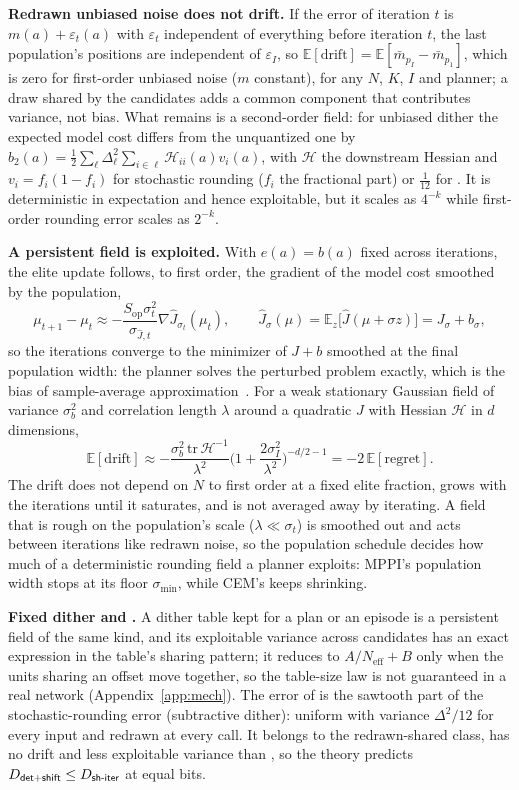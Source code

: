 \textbf{Redrawn unbiased noise does not drift.} If the error of iteration $t$ is $m(a)+\varepsilon_t(a)$ with $\varepsilon_t$ independent of everything before iteration $t$, the last population's positions are independent of $\varepsilon_I$, so $\mathbb E[\mathrm{drift}]=\mathbb E[\bar m_{p_I}-\bar m_{p_1}]$, which is zero for first-order unbiased noise ($m$ constant), for any $N$, $K$, $I$ and planner; a draw shared by the candidates adds a common component that contributes variance, not bias. What remains is a second-order field: for unbiased dither the expected model cost differs from the unquantized one by $b_2(a)=\tfrac12\sum_\ell\Delta_\ell^2\sum_{i\in\ell}\mathcal H_{ii}(a)v_i(a)$, with $\mathcal H$ the downstream Hessian and $v_i=f_i(1-f_i)$ for stochastic rounding ($f_i$ the fractional part) or $\tfrac1{12}$ for \detshift. It is deterministic in expectation and hence exploitable, but it scales as $4^{-k}$ while first-order rounding error scales as $2^{-k}$.

\textbf{A persistent field is exploited.} With $e(a)=b(a)$ fixed across iterations, the elite update follows, to first order, the gradient of the model cost smoothed by the population,
\[
\mu_{t+1}-\mu_t\approx-\frac{S_{\mathrm{op}}\sigma_t^2}{\sigma_{\hat J,t}}\nabla\hat J_{\sigma_t}(\mu_t),\qquad \hat J_\sigma(\mu)=\mathbb E_z\big[\hat J(\mu+\sigma z)\big]=J_\sigma+b_\sigma,
\]
so the iterations converge to the minimizer of $J+b$ smoothed at the final population width: the planner solves the perturbed problem exactly, which is the bias of sample-average approximation~\citep{kleywegt2002saa}. For a weak stationary Gaussian field of variance $\sigma_b^2$ and correlation length $\lambda$ around a quadratic $J$ with Hessian $\mathcal H$ in $d$ dimensions,
\[
\mathbb E[\mathrm{drift}]\approx-\frac{\sigma_b^2\,\mathrm{tr}\,\mathcal H^{-1}}{\lambda^2}\Big(1+\frac{2\sigma_I^2}{\lambda^2}\Big)^{-d/2-1}=-2\,\mathbb E[\mathrm{regret}].
\]
The drift does not depend on $N$ to first order at a fixed elite fraction, grows with the iterations until it saturates, and is not averaged away by iterating. A field that is rough on the population's scale ($\lambda\ll\sigma_t$) is smoothed out and acts between iterations like redrawn noise, so the population schedule decides how much of a deterministic rounding field a planner exploits: MPPI's population width stops at its floor $\sigma_{\min}$, while CEM's keeps shrinking.

\textbf{Fixed dither and \detshift.} A dither table kept for a plan or an episode is a persistent field of the same kind, and its exploitable variance across candidates has an exact expression in the table's sharing pattern; it reduces to $A/N_{\mathrm{eff}}+B$ only when the units sharing an offset move together, so the table-size law is not guaranteed in a real network (Appendix~\ref{app:mech}). The error of \detshift is the sawtooth part of the stochastic-rounding error (subtractive dither): uniform with variance $\Delta^2/12$ for every input and redrawn at every call. It belongs to the redrawn-shared class, has no drift and less exploitable variance than \shiter, so the theory predicts $D_{\textsf{det+shift}}\le D_{\textsf{sh-iter}}$ at equal bits.

